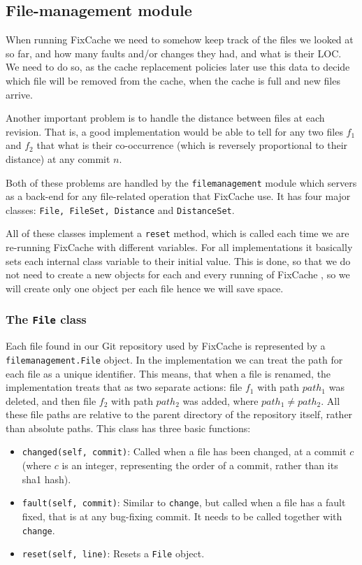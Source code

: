 \documentclass[12pt,twoside,notitlepage]{report}
\newcommand{\fxch}{FixCache }
\begin{document}
\subsection{File-management module}
When running \fxch we need to somehow keep track of the files we looked at so far, and how many faults and/or changes they had, and what is their LOC. We need to do so, as the cache replacement policies later use this data to decide which file will be removed from the cache, when the cache is full and new files arrive.

Another important problem is to handle the distance between files at each revision. That is, a good implementation would be able to tell for any two files $f_1$ and $f_2$ that what is their co-occurrence (which is reversely proportional to their distance) at any commit $n$.

Both of these problems are handled by the \texttt{filemanagement} module which servers as a back-end for any file-related operation that \fxch use. It has four major classes: \texttt{File, FileSet, Distance} and \texttt{DistanceSet}.

All of these classes implement a \texttt{reset} method, which is called each time we are re-running \fxch with different variables. For all implementations it basically sets each internal class variable to their initial value. This is done, so that we do not need to create a new objects for each and every running of \fxch, so we will create only one object per each file hence we will save space.
\subsubsection*{The \texttt{File} class}
Each file found in our Git repository used by \fxch is represented by a \texttt{filemanagement.File} object. In the implementation we can treat the path for each file as a unique identifier. This means, that when a file is renamed, the implementation treats that as two separate actions: file $f_1$ with path $path_1$ was deleted, and then file $f_2$ with path $path_2$ was added, where $path_1 \neq path_2$. All these file paths are relative to the parent directory of the repository itself, rather than absolute paths. This class has three basic functions:
\begin{itemize}
\item \texttt{changed(self, commit)}: Called when a file has been changed, at a commit $c$ (where $c$ is an integer, representing the order of a commit, rather than its sha1 hash).
\item \texttt{fault(self, commit)}: Similar to \texttt{change}, but called when a file has a fault fixed, that is at any bug-fixing commit. It needs to be called together with \texttt{change}.
\item \texttt{reset(self, line)}: Resets a \texttt{File} object.
\end{itemize}
\end{document}
